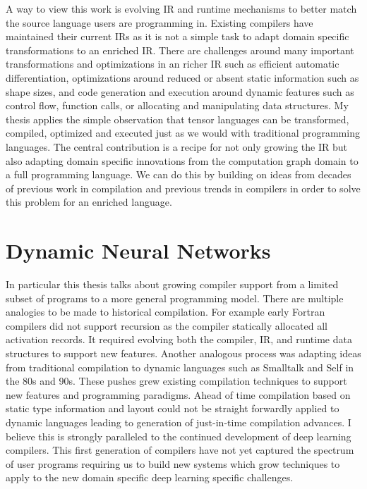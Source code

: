 A way to view this work is evolving IR and runtime mechanisms to better
  match the source language users are programming in.
Existing compilers have maintained their current IRs as it is not a simple
  task to adapt domain specific transformations to an enriched IR.
There are challenges around many important transformations and optimizations
  in an richer IR such as efficient automatic differentiation, optimizations around
  reduced or absent static information such as shape sizes, and code generation
  and execution around dynamic features such as control flow, function calls,
  or allocating and manipulating data structures.
My thesis applies the simple observation that tensor languages can be transformed, compiled,
  optimized and executed just as we would with traditional programming languages.
The central contribution is a recipe for not only growing the IR but also
  adapting domain specific innovations from the computation graph domain to
  a full programming language.
We can do this by building on ideas from decades of previous work in compilation and previous
    trends in compilers in order to solve this problem for an enriched language.

\section{Dynamic Neural Networks}

In particular this thesis talks about growing compiler support from
  a limited subset of programs to a more general programming model.
There are multiple analogies to be made to historical compilation.
For example early Fortran compilers did not support recursion
  as the compiler statically allocated all activation records.
It required evolving both the compiler, IR, and runtime data structures
  to support new features.
Another analogous process was adapting ideas from traditional compilation
  to dynamic languages such as Smalltalk and Self in the 80s and 90s.
These pushes grew existing compilation techniques to support new features
  and programming paradigms.
Ahead of time compilation based on static type information and layout
  could not be straight forwardly applied to dynamic languages leading
  to generation of just-in-time compilation advances.
I believe this is strongly paralleled to the continued
  development of deep learning compilers.
This first generation of compilers have not yet
  captured the spectrum of user programs requiring us to build
  new systems which grow techniques to apply to the new
  domain specific deep learning specific challenges.

